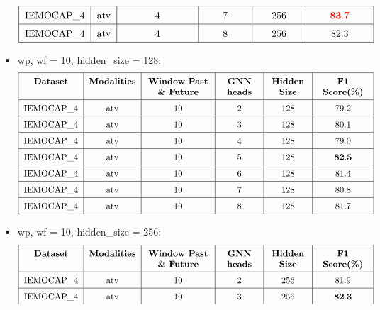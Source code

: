 \documentclass[a4paper]{article}
\begin{document}
\begin{itemize}
\[\begin{tabular}{|c|c|p{2.5cm}<{\centering}|p{1.5cm}<{\centering}|p{1.5cm}<{\centering}|p{2cm}<{\centering}|}
            \hline
            \text{IEMOCAP\_4} & \text{atv} & 4 & 7 & 256 & \(\color{red}{\mathbf{83.7}}\) \\
            \hline
            \text{IEMOCAP\_4} & \text{atv} & 4 & 8 & 256 & 82.3 \\
            \hline
        \end{tabular}    
        \]
    \item wp, wf = 10, hidden\_size = 128:
        \[
        \renewcommand{\arraystretch}{1.5}
        \begin{tabular}{|c|c|p{2.5cm}<{\centering}|p{1.5cm}<{\centering}|p{1.5cm}<{\centering}|p{2cm}<{\centering}|}
            \hline
            \textbf{Dataset} & \textbf{Modalities} & \textbf{Window Past \& Future} & \textbf{GNN heads} & \textbf{Hidden Size} & \textbf{F1 Score(\%)} \\
            \hline
            \text{IEMOCAP\_4} & \text{atv} & 10 & 2 & 128 & 79.2 \\
            \hline
            \text{IEMOCAP\_4} & \text{atv} & 10 & 3 & 128 & 80.1 \\
            \hline
            \text{IEMOCAP\_4} & \text{atv} & 10 & 4 & 128 & 79.0 \\
            \hline
            \text{IEMOCAP\_4} & \text{atv} & 10 & 5 & 128 & \(\mathbf{82.5}\) \\
            \hline
            \text{IEMOCAP\_4} & \text{atv} & 10 & 6 & 128 & 81.4 \\
            \hline
            \text{IEMOCAP\_4} & \text{atv} & 10 & 7 & 128 & 80.8 \\
            \hline
            \text{IEMOCAP\_4} & \text{atv} & 10 & 8 & 128 & 81.7 \\
            \hline
        \end{tabular}    
        \]
    \item wp, wf = 10, hidden\_size = 256:
        \[
        \renewcommand{\arraystretch}{1.5}
        \begin{tabular}{|c|c|p{2.5cm}<{\centering}|p{1.5cm}<{\centering}|p{1.5cm}<{\centering}|p{2cm}<{\centering}|}
            \hline
            \textbf{Dataset} & \textbf{Modalities} & \textbf{Window Past \& Future} & \textbf{GNN heads} & \textbf{Hidden Size} & \textbf{F1 Score(\%)} \\
            \hline
            \text{IEMOCAP\_4} & \text{atv} & 10 & 2 & 256 & 81.9 \\
            \hline
            \text{IEMOCAP\_4} & \text{atv} & 10 & 3 & 256 & \(\mathbf{82.3}\) \\

\end{tabular}\]
\end{itemize}
\end{document}
